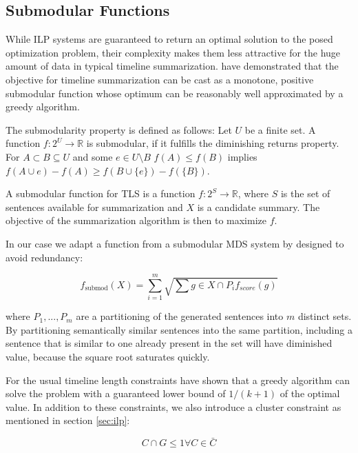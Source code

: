 \documentclass[a4paper,BCOR=10mm]{report}
\begin{document}
\subsection{Submodular Functions}

While ILP systems are guaranteed to return an optimal solution to the posed optimization problem, their complexity makes them less attractive for the huge amount of data in typical timeline summarization. \citet{markert} have demonstrated that the objective for timeline summarization can be cast as a monotone, positive submodular function whose optimum can be reasonably well approximated by a greedy algorithm.

The submodularity property is defined as follows:
 Let $U$ be a finite set. A function $f: 2^{U} \rightarrow \mathbb{R}$ is submodular, if it fulfills the diminishing returns property. For $A \subset B \subseteq U$ and some $e \in U \setminus B$ $f(A) \leq f(B)$ implies $f(A \cup e) - f(A) \geq f(B \cup \{e\}) - f(\{B\})$.

A submodular function for TLS is a function $f: 2^{S} \rightarrow \mathbb{R}$, where $S$ is the set of sentences available for summarization and $X$ is a candidate summary.
The objective of the summarization algorithm is then to maximize $f$.

In our case we adapt a function from a submodular MDS system by \citet{lin+blimes} designed to avoid redundancy:

\begin{displaymath}
f_{\text{submod}}(X) = \sum_{i = 1}^{m} \sqrt{\sum{g \in X \cap P_i} f_{score}(g)}
\end{displaymath}

where $P_1, ..., P_m$ are a partitioning of the generated sentences into $m$ distinct sets. By partitioning semantically similar sentences into the same partition, including a sentence that is similar to one already present in the set will have diminished value, because the square root saturates quickly.

 For the usual timeline length constraints \citet{markert} have shown that a greedy algorithm can solve the problem with a guaranteed lower bound of $1 / (k + 1)$ of the optimal value.
 In addition to these constraints, we also introduce a cluster constraint as mentioned in section \ref{sec:ilp}:

\begin{displaymath}
C \cap G \leq 1 \forall C \in \bar{C}
\end{displaymath}
\end{document}
